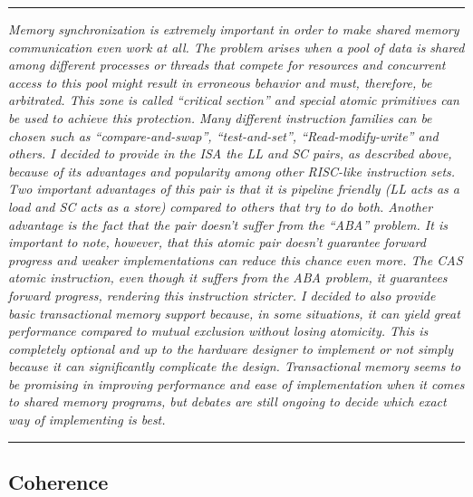 \documentclass{article}
\begin{document}
        \par\noindent\rule{\textwidth}{0.4pt}
        \textit{Memory synchronization is extremely important in order to make shared memory communication even work at all. The problem arises when a pool of data is shared among different processes or threads that compete for resources and concurrent access to this pool might result in erroneous behavior and must, therefore, be arbitrated. This zone is called ``critical section'' and special atomic primitives can be used to achieve this protection. Many different instruction families can be chosen such as ``compare-and-swap'', ``test-and-set'', ``Read-modify-write'' and others. I decided to provide in the ISA the LL and SC pairs, as described above, because of its advantages and popularity among other RISC-like instruction sets. Two important advantages of this pair is that it is pipeline friendly (LL acts as a load and SC acts as a store) compared to others that try to do both. Another advantage is the fact that the pair doesn't suffer from the ``ABA'' problem. It is important to note, however, that this atomic pair doesn't guarantee forward progress and weaker implementations can reduce this chance even more. The CAS atomic instruction, even though it suffers from the ABA problem, it guarantees forward progress, rendering this instruction stricter. I decided to also provide basic transactional memory support because, in some situations, it can yield great performance compared to mutual exclusion without losing atomicity. This is completely optional and up to the hardware designer to implement or not simply because it can significantly complicate the design. Transactional memory seems to be promising in improving performance and ease of implementation when it comes to shared memory programs, but debates are still ongoing to decide which exact way of implementing is best.}
        \par\noindent\rule{\textwidth}{0.4pt}

        \subsection{Coherence}

            \vspace{10pt}
\end{document}
